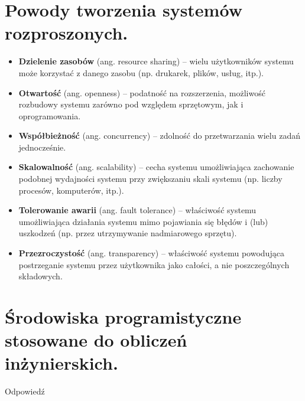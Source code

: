 \documentclass[12pt,a4paper]{article}
\begin{document}
	\section{Powody tworzenia systemów rozproszonych.}
	\begin{itemize}
		\item \textbf{Dzielenie zasobów} (ang. resource sharing) – wielu użytkowników systemu może korzystać z danego zasobu (np. drukarek, plików, usług, itp.).
		
		\item \textbf{Otwartość} (ang. openness) – podatność na rozszerzenia, możliwość rozbudowy systemu zarówno pod względem sprzętowym, jak i oprogramowania.
		
		\item \textbf{Współbieżność} (ang. concurrency) – zdolność do przetwarzania wielu zadań jednocześnie.
		
		\item \textbf{Skalowalność} (ang. scalability) – cecha systemu umożliwiająca zachowanie podobnej wydajności systemu przy zwiększaniu skali systemu (np. liczby procesów, komputerów, itp.).
		
		\item \textbf{Tolerowanie awarii} (ang. fault tolerance) – właściwość systemu umożliwiająca działania systemu mimo pojawiania się błędów i (lub) uszkodzeń (np. przez utrzymywanie nadmiarowego sprzętu).
		
		\item \textbf{Przezroczystość} (ang. transparency) – właściwość systemu powodująca postrzeganie systemu przez użytkownika jako całości, a nie poszczególnych składowych.
	\end{itemize}

	\section{Środowiska programistyczne stosowane do obliczeń inżynierskich.}
	Odpowiedź
\end{document}
